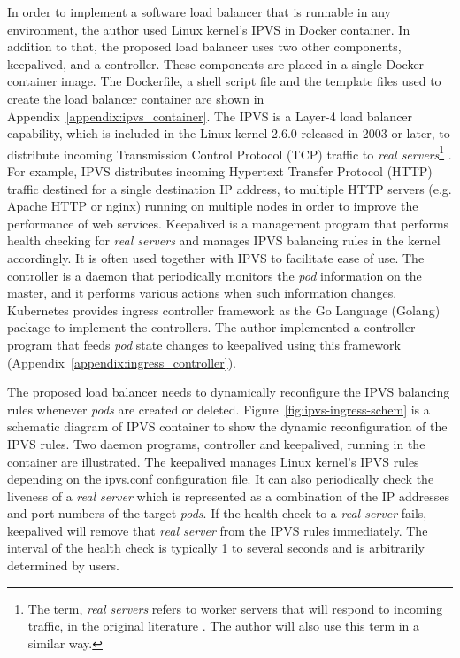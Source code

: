 In order to implement a software load balancer that is runnable in any environment, the author used Linux kernel's IPVS in Docker container.
In addition to that, the proposed load balancer uses two other components, keepalived{, and a }controller.
These components are placed in a single Docker container image.
The Dockerfile, a shell script file and the template files used to create the load balancer container are shown in Appendix~\ref{appendix:ipvs_container}. 
The IPVS is a Layer-4 load balancer capability, which is included in the Linux kernel 2.6.0 released in 2003 or later,
to distribute incoming Transmission Control Protocol (TCP) traffic to
{\em real servers}\footnote{The term, {\em real servers} refers to worker servers that will respond to incoming traffic,
in the original literature \cite{Zhang2000}. The author will also use this term in a similar way.} \cite{Zhang2000}.
For example, IPVS distributes incoming Hypertext Transfer Protocol (HTTP) traffic destined for a single destination IP address,
to multiple HTTP servers (e.g. Apache HTTP or nginx) running on multiple nodes in order to improve the performance of web services.
Keepalived is a management program that performs health checking for {\em real servers}
and manages IPVS balancing rules in the kernel accordingly.
It is often used together with IPVS to facilitate ease of use.
The controller is a daemon that periodically monitors the {\em pod} information on the master,
and it performs various actions when such information changes.
Kubernetes provides ingress controller framework as the Go Language (Golang) package to implement the controllers.
The author implemented a controller program that feeds {\em pod} state changes to keepalived
using this framework (Appendix~\ref{appendix:ingress_controller}).

The proposed load balancer needs to dynamically reconfigure the IPVS balancing rules whenever {\em pods} are created or deleted. 
Figure~\ref{fig:ipvs-ingress-schem} is a schematic diagram of IPVS container to show the dynamic reconfiguration of the IPVS rules.
Two daemon programs, controller and keepalived, running in the container are illustrated.
The keepalived manages Linux kernel's IPVS rules depending on the ipvs.conf configuration file.
It can also periodically check the liveness of a {\em real server}
%
which is represented as a combination of the IP addresses and port numbers of the target {\em pods}. 
If the health check to a {\em real server} fails, keepalived will remove that {\em real server} from the IPVS rules immediately.
The interval of the health check is typically 1 to several seconds and is arbitrarily determined by users.  

